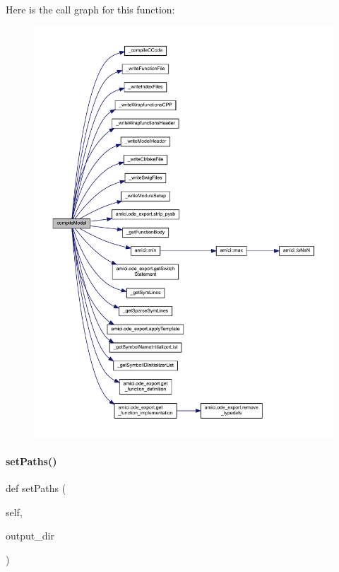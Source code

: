 Here is the call graph for this function\+:
\nopagebreak
\begin{figure}[H]
\begin{center}
\leavevmode
\includegraphics[width=350pt]{classamici_1_1ode__export_1_1_o_d_e_exporter_a61bf03049b9989d73b584fbca9f8d499_cgraph}
\end{center}
\end{figure}
\mbox{\label{classamici_1_1ode__export_1_1_o_d_e_exporter_a30886da9525f87826d3da2543a4aebbd}} 
\paragraph{\texorpdfstring{setPaths()}{setPaths()}}
{\footnotesize\ttfamily def set\+Paths (\begin{DoxyParamCaption}\item[{}]{self,  }\item[{}]{output\+\_\+dir }\end{DoxyParamCaption})}


